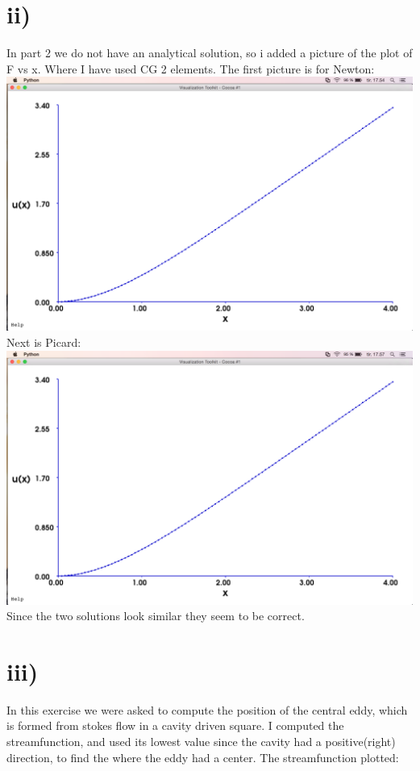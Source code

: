\documentclass[a4paper,norsk]{article}
\begin{document}
\section*{ii)}
In part 2 we do not have an analytical solution, so i added a picture of the plot of F vs x. Where I have used CG 2 elements.
The first picture is for Newton:
\newline
\newline
\includegraphics[trim = 5mm 0mm 2mm 25mm, clip, scale=0.3]{Newton_F.png}
\newline
\newline
Next is Picard:
\newline
\newline
\includegraphics[trim = 5mm 0mm 0mm 25mm, clip, scale=0.3]{Picard_F.png} \newline
Since the two solutions look similar they seem to be correct.


\newpage
\section*{iii)}
In this exercise we were asked to compute the position of the central eddy, which is formed from stokes flow in a cavity driven square. I computed the streamfunction, and used its lowest value since the cavity had a positive(right) direction, to find the where the eddy had a center. 
\newline
The streamfunction plotted:
\end{document}
